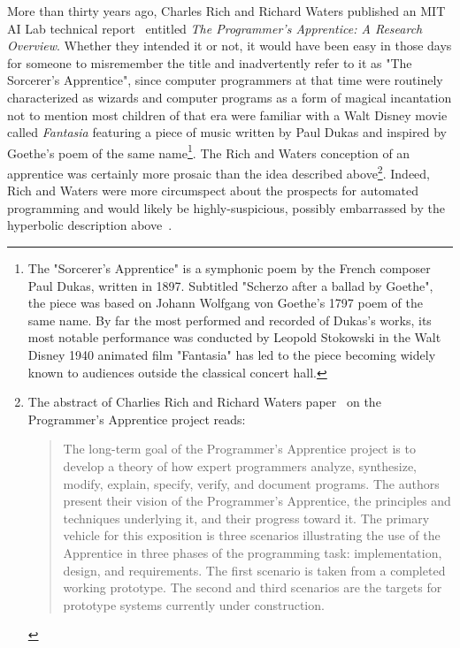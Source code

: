 More than thirty years ago, Charles Rich and Richard Waters published an MIT AI Lab technical report~\cite{RichandWatersAIM-87} entitled {\it{The Programmer's Apprentice: A Research Overview}}. Whether they intended it or not, it would have been easy in those days for someone to misremember the title and inadvertently refer to it as "The Sorcerer's Apprentice", since computer programmers at that time were routinely characterized as wizards and computer programs as a form of magical incantation \emdash{} not to mention most children of that era were familiar with a Walt Disney movie called {\it{Fantasia}} featuring a piece of music written by Paul Dukas and inspired by Goethe's poem of the same name\footnote{%
%
  The "Sorcerer's Apprentice" is a symphonic poem by the French composer Paul Dukas, written in 1897. Subtitled "Scherzo after a ballad by Goethe", the piece was based on Johann Wolfgang von Goethe's 1797 poem of the same name. By far the most performed and recorded of Dukas's works, its most notable performance was conducted by Leopold Stokowski in the Walt Disney 1940 animated film "Fantasia" has led to the piece becoming widely known to audiences outside the classical concert hall. {}}.
%
The Rich and Waters conception of an apprentice was certainly more prosaic than the idea described above\footnote{%
%
  The abstract of Charlies Rich and Richard Waters paper~\cite{RichandWatersAIM-87} on the Programmer's Apprentice project reads:
%
  \begin{quotation}
%
    The long-term goal of the Programmer's Apprentice project is to develop a theory of how expert programmers analyze, synthesize, modify, explain, specify, verify, and document programs. The authors present their vision of the Programmer's Apprentice, the principles and techniques underlying it, and their progress toward it. The primary vehicle for this exposition is three scenarios illustrating the use of the Apprentice in three phases of the programming task: implementation, design, and requirements. The first scenario is taken from a completed working prototype. The second and third scenarios are the targets for prototype systems currently under construction.
%
  \end{quotation}}.
%
Indeed, Rich and Waters were more circumspect about the prospects for automated programming and would likely be highly-suspicious, possibly embarrassed by the hyperbolic description above~\cite{RichandWatersCOMPUTER-88}.

